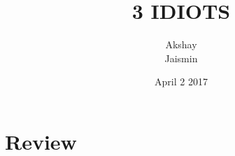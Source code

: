 \documentclass{article}
\title{3 IDIOTS}
\author{Akshay\\Jaismin}
\date{April 2 2017}
\begin{document}
\maketitle
\section{Review}
\end{document}
